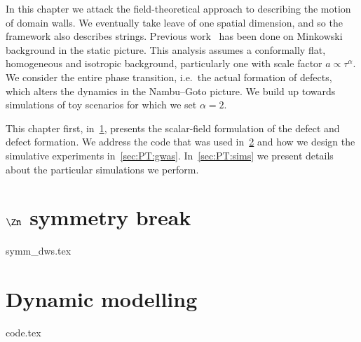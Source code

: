 








In this chapter we attack the field-theoretical approach to describing the motion of domain walls. We eventually take leave of one spatial dimension, and so the framework also describes strings. %
Previous work~\citep{blanco-pilladoDynamicsDomainWall2023} has been done on Minkowski background in the static picture. This analysis assumes a conformally flat, homogeneous and isotropic background, particularly one with scale factor $a\propto \tau^\alpha$. We consider the entire phase transition, i.e.~the actual formation of defects, which alters the dynamics in the Nambu--Goto picture. %
We build up towards simulations of toy scenarios for which we set $\alpha=2$.


This chapter first, in~\cref{sec:PT:symm_dws}, presents the scalar-field formulation of the defect and defect formation. We address the code that was used in~\cref{sec:PT:code} and how we design the simulative experiments in~\cref{sec:PT:gwas}. In~\cref{sec:PT:sims} we present details about the particular simulations we perform.








\section{\(\Zn\) symmetry break}\label{sec:PT:symm_dws}
    {{symm_dws.tex}}


\section{Dynamic modelling}\label{sec:PT:code} %
    {{code.tex}}

